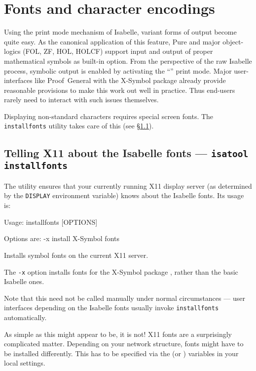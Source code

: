 

\chapter{Fonts and character encodings}

Using the print mode mechanism of Isabelle, variant forms of output become
quite easy. As the canonical application of this feature, Pure and major
object-logics (FOL, ZF, HOL, HOLCF) support input and output of proper
mathematical symbols as built-in option.  From the perspective of the raw
Isabelle process, symbolic output is enabled by activating the
``'' print mode.  Major user-interfaces like Proof~General
\cite{proofgeneral} with the X-Symbol package \cite{x-symbol} already provide
reasonable provisions to make this work out well in practice.  Thus end-users
rarely need to interact with such issues themselves.

\medskip Displaying non-standard characters requires special screen fonts. The
\texttt{installfonts} utility takes care of this (see
\S\ref{sec:tool-installfonts}).


\section{Telling X11 about the Isabelle fonts --- \texttt{isatool installfonts}}
\label{sec:tool-installfonts}

The  utility ensures that your currently running X11
display server (as determined by the \texttt{DISPLAY} environment variable)
knows about the Isabelle fonts. Its usage is:
\begin{ttbox}
Usage: installfonts [OPTIONS]

  Options are:
    -x           install X-Symbol fonts

  Installs symbol fonts on the current X11 server.
\end{ttbox}

The \texttt{-x} option installs fonts for the X-Symbol package
\cite{x-symbol}, rather than the basic Isabelle ones.

Note that this need not be called manually under normal circumstances --- user
interfaces depending on the Isabelle fonts usually invoke
\texttt{installfonts} automatically.

\medskip As simple as this might appear to be, it is not! X11 fonts are a
surprisingly complicated matter. Depending on your network structure, fonts
might have to be installed differently. This has to be specified via the
 (or ) variables in
your local settings.

